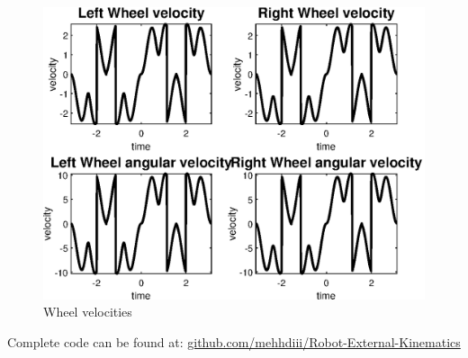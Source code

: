 \documentclass[12pt,letterpaper]{article}
\begin{document}
\begin{figure} [h]
    \centering
    \includegraphics[]{figures/task2.eps}
    \caption{Wheel velocities}
    \label{fig:my_label}
\end{figure}
Complete code can be found at: \href{https://github.com/mehhdiii/Robot-External-Kinematics}{github.com/mehhdiii/Robot-External-Kinematics}
\end{document}
